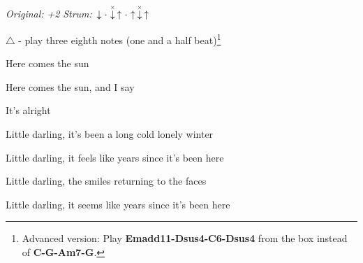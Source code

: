 \begin{song}


\begin{headerbox}
\RaiseBoxWithAccents
{} \quad
\textit{Original: +2} \quad
\textit{Strum:} $\Down\Miss\ChuckDown\Up\Miss\Up\ChuckDown\Up$
\end{headerbox}

\begin{hchordbox}
\end{hchordbox}

\Large

\bigskip

{
\smaller $\triangle$ - play three eighth notes (one and a half beat)\footnote{Advanced version: Play \textbf{Emadd11-Dsus4-C6-Dsus4} from the box instead of \textbf{C-G-Am7-G}.}
}

\bigskip

\begin{chorusbox}{\Chorus}
 Here comes the sun  \par
{} Here comes the sun, and I say \par
{} It's alright   \par
{}  \par
\end{chorusbox}

\bigskip

 Little darling, it's been a long cold lonely winter \par
{} Little darling, it feels like years since it's been here \par

\bigskip

\Chorus

\bigskip

 Little darling, the smiles returning to the faces \par
{} Little darling, it seems like years since it's been here \par

\bigskip

\Chorus

\bigskip


\end{song}
